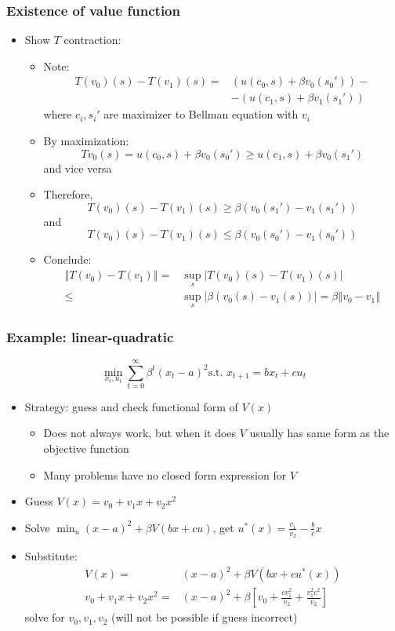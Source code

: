 \documentclass[compress]{beamer}
\newcommand{\norm}[1]{\left\Vert {#1} \right\Vert}
\begin{document}
\begin{frame}[shrink]  \frametitle{Existence of value function}
  \begin{itemize}
  \item Show $T$ contraction: 
    \begin{itemize}
    \item Note:
      \begin{align*}
        T(v_0)(s)-T(v_1)(s) =  & \left(u(c_0,s) + \beta v_0(s_0')
        \right) - \\ & - 
        \left(u(c_1,s) + \beta v_1(s_1')  \right)
      \end{align*} 
      where $c_i,s_i'$ are maximizer to Bellman equation with $v_i$
    \item By maximization: 
      \[ T v_0 (s) = u(c_0,s) + \beta v_0(s_0')  \geq u(c_1,s) + \beta
      v_0(s_1') \] 
      and vice versa
    \item 
      Therefore, 
      \[ T(v_0)(s) - T(v_1)(s) \geq \beta (v_0(s_1') - v_1(s_1')) \]
      and
      \[ T(v_0)(s)-T(v_1)(s) \leq \beta (v_0(s_0') - v_1(s_0'))  \]
    \item Conclude:
      \begin{align*}
        \norm{T(v_0)-T(v_1)} = & \sup_{s} \left\vert T(v_0)(s)-T(v_1)(s) \right\vert \\
        \leq & \sup_s \left\vert \beta(v_0(s) -v_1(s)) \right\vert =
        \beta \norm{v_0 - v_1}
      \end{align*}
    \end{itemize}
  \end{itemize}
\end{frame}

\begin{frame} \frametitle{Example: linear-quadratic}
  \[ \min_{x_t,u_t} \sum_{t=0}^\infty \beta^t (x_t - a)^2 \text{
    s.t. } x_{t+1} = b x_t + c u_t \]
  \begin{itemize}
  \item Strategy: guess and check functional form of $V(x)$ 
    \begin{itemize}
    \item Does not always work, but when it does $V$ usually has same
      form as the objective function
    \item Many problems have no closed form expression for $V$
    \end{itemize}
  \item Guess $V(x) = v_0 + v_1 x + v_2 x^2$
  \item Solve $\min_u (x-a)^2 + \beta V(bx + c u)$, get $u^\ast(x) =
    \frac{v_1}{v_2} - \frac{b}{c} x$
  \item Substitute:
    \begin{align*}
      V(x) = & (x-a)^2 + \beta V(bx+cu^\ast(x)) \\
      v_0 + v_1 x + v_2 x^2 = & (x-a)^2 + \beta\left[ v_0 + \frac{c
          v_1^2}{v_2} + \frac{v_1^2 c^2}{v_2} \right]
    \end{align*}
    solve for $v_0, v_1, v_2$ (will not be possible if guess incorrect)
  \end{itemize}
\end{frame}
\end{document}
